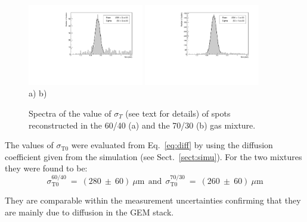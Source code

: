 \documentclass[a4paper,11pt]{article}
\begin{document}
\begin{figure}[ht]
\centering
\includegraphics[width=0.45\textwidth]{Figures/Draft2_DB_Size_6040.pdf}
\includegraphics[width=0.45\textwidth]{Figures/Draft2_DB_Size_7030.pdf} \\
\vspace{-0.3cm}
\mbox{a)} \hspace{6cm} \mbox{b)}
\vspace{-0.3cm}

\caption{Spectra of the value of $\sigma_T$ (see text for details) of spots reconstructed in the 60/40 (a) and the 70/30 (b) gas mixture.}
\label{fig:sizeZ}
\end{figure}

The values of $\sigma_{\mathrm{T0}}$ were evaluated from Eq.~\ref{eq:diff} by using the diffusion coefficient given from the simulation (see Sect.~\ref{sect:simu}).
For the two mixtures they were found to be:
$$
\sigma^{60/40}_{\mathrm{T0}}~=~(280~\pm~60)~\mu{\mathrm{m}}
{\mathrm{~~and~~}} 
\sigma^{70/30}_{\mathrm{T0}}~=~(260~\pm~60)~\mu{\mathrm{m}}
$$
 
They are comparable within the measurement uncertainties confirming that they are mainly due to diffusion in the GEM stack.

\end{document}
